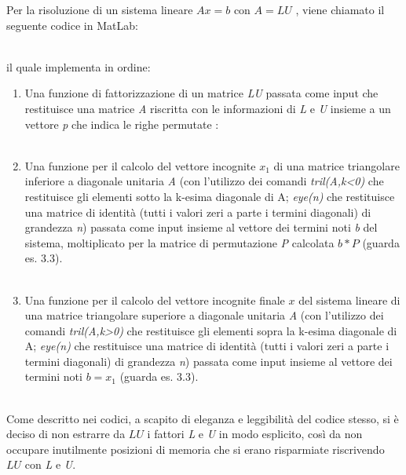 Per la risoluzione di un sistema lineare $Ax=b$ con $A=LU$ , viene chiamato il seguente codice in MatLab:\\\

il quale implementa in ordine:
\begin{enumerate}
\item
Una funzione di fattorizzazione di un matrice \textit{LU} passata come input che restituisce una matrice \textit{A} riscritta con le informazioni di \textit{L} e \textit{U} insieme a un vettore \textit{p} che indica le righe permutate :\\\

\item
Una funzione per il calcolo del vettore incognite $x_1$ di una matrice triangolare inferiore a diagonale unitaria \textit{A} (con l'utilizzo dei comandi \textit{tril(A,k<0)} che restituisce gli elementi sotto la k-esima diagonale di A; \textit{eye(n)} che restituisce una matrice di identità (tutti i valori zeri a parte i termini diagonali) di grandezza \textit{n}) passata come input insieme al vettore dei termini noti \textit{b} del sistema, moltiplicato per la matrice di permutazione \textit{P} calcolata $b*P$ (guarda es. 3.3). \\\
\item
Una funzione per il calcolo del vettore incognite finale $x$ del sistema lineare di una matrice triangolare superiore a diagonale unitaria \textit{A} (con l'utilizzo dei comandi \textit{tril(A,k>0)} che restituisce gli elementi sopra la k-esima diagonale di A; \textit{eye(n)} che restituisce una matrice di identità (tutti i valori zeri a parte i termini diagonali) di grandezza \textit{n}) passata come input insieme al vettore dei termini noti $b=x_1$ (guarda es. 3.3).\\\
\end{enumerate}
Come descritto nei codici, a scapito di eleganza e leggibilità del codice stesso, si è deciso di non estrarre da $LU$ i fattori \textit{L} e \textit{U} in modo esplicito, così da non occupare inutilmente posizioni di memoria che si erano risparmiate riscrivendo $LU$ con \textit{L} e \textit{U}.